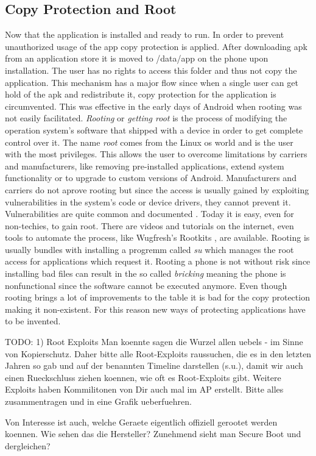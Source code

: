 \subsection{Copy Protection and Root} \label{subsection:android-copyroot}
Now that the application is installed and ready to run.
In order to prevent unauthorized usage of the app copy protection is applied.
After downloading \gls{apk} from an application store it is moved to /data/app on the phone upon installation.
The user has no rights to access this folder and thus not copy the application.
This mechanism has a major flow since when a single user can get hold of the \gls{apk} and redistribute it, copy protection for the application is circumvented.
This was effective in the early days of Android when rooting was not easily facilitated.
\newline
\textit{Rooting} or \textit{getting root} is the process of modifying the operation system's software that shipped with a device in order to get complete control over it.
The name \textit{root} comes from the Linux \gls{os} world and is the user with the most privileges.
This allows the user to overcome limitations by carriers and manufacturers, like removing pre-installed applications, extend system functionality or to upgrade to custom versions of Android.
Manufacturers and carriers do not aprove rooting but since the access is usually gained by exploiting vulnerabilities in the system's code or device drivers, they cannot prevent it.
Vulnerabilities are quite common and documented \cite{androidVul}.
Today it is easy, even for non-techies, to gain root.
There are videos and tutorials on the internet, even tools to automate the process, like Wugfresh's Rootkits \cite{wugfresh}, are available.
Rooting is usually bundles with installing a progremm called \textit{su} which manages the root access for applications which request it.
Rooting a phone is not without risk since installing bad files can result in the so called \textit{bricking} meaning the phone is nonfunctional since the software cannot be executed anymore.\cite{androidpoliceRoot}
\newline
Even though rooting brings a lot of improvements to the table it is bad for the copy protection making it non-existent. For this reason new ways of protecting applications have to be invented.


TODO:
1) Root Exploits
Man koennte sagen die Wurzel allen uebels - im Sinne von Kopierschutz. Daher bitte alle Root-Exploits raussuchen, die es in den letzten Jahren so gab und auf der benannten Timeline darstellen (s.u.), damit wir auch einen Rueckschluss ziehen koennen, wie oft es Root-Exploits gibt.  Weitere Exploits haben Kommilitonen von Dir auch mal im AP erstellt. Bitte alles zusammentragen und in eine Grafik ueberfuehren.

Von Interesse ist auch, welche Geraete eigentlich offiziell gerootet werden koennen. Wie sehen das die Hersteller? Zunehmend sieht man Secure Boot und dergleichen?
